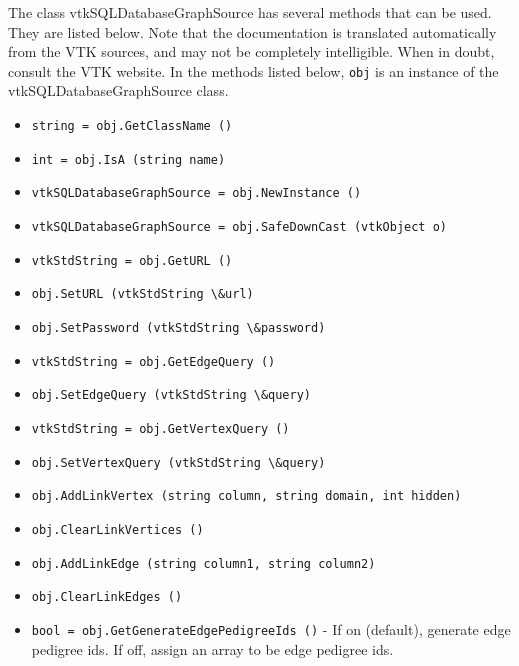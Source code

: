The class vtkSQLDatabaseGraphSource has several methods that can be used.
  They are listed below.
Note that the documentation is translated automatically from the VTK sources,
and may not be completely intelligible.  When in doubt, consult the VTK website.
In the methods listed below, \verb|obj| is an instance of the vtkSQLDatabaseGraphSource class.
\begin{itemize}
\item  \verb|string = obj.GetClassName ()|

\item  \verb|int = obj.IsA (string name)|

\item  \verb|vtkSQLDatabaseGraphSource = obj.NewInstance ()|

\item  \verb|vtkSQLDatabaseGraphSource = obj.SafeDownCast (vtkObject o)|

\item  \verb|vtkStdString = obj.GetURL ()|

\item  \verb|obj.SetURL (vtkStdString \&url)|

\item  \verb|obj.SetPassword (vtkStdString \&password)|

\item  \verb|vtkStdString = obj.GetEdgeQuery ()|

\item  \verb|obj.SetEdgeQuery (vtkStdString \&query)|

\item  \verb|vtkStdString = obj.GetVertexQuery ()|

\item  \verb|obj.SetVertexQuery (vtkStdString \&query)|

\item  \verb|obj.AddLinkVertex (string column, string domain, int hidden)|

\item  \verb|obj.ClearLinkVertices ()|

\item  \verb|obj.AddLinkEdge (string column1, string column2)|

\item  \verb|obj.ClearLinkEdges ()|

\item  \verb|bool = obj.GetGenerateEdgePedigreeIds ()| -  If on (default), generate edge pedigree ids.
 If off, assign an array to be edge pedigree ids.


\end{itemize}
